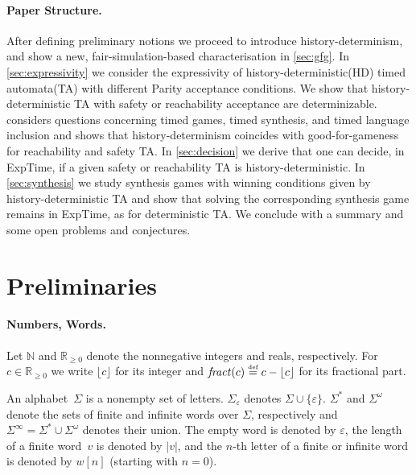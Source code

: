 \documentclass[10pt,a4paper]{amsart}
\theoremstyle{definition}
\numberwithin{equation}{section}
\renewcommand{\epsilon}{\varepsilon}
\newcommand{\size}[1]{|#1|}
\newcommand{\N}{\mathbb{N}}
\newcommand{\nnreals}{{\mathbb R}_{\geq 0}}
\newcommand{\eqby}[2][=]{\stackrel{\text{{\tiny{#2}}}}{#1}}
\newcommand{\eqdef}{\eqby{def}}
\newcommand{\fractof}[1]{{\it fract}(#1)} %
\newcommand{\intof}[1]{\floor{#1}}
\newcommand{\floor}[1]{\lfloor#1\rfloor}
\newcommand{\EXPTIME}{{\sc ExpTime}}
\newcommand{\mypar}[1]{\paragraph*{#1.}}
\begin{document}
\medskip
\mypar{Paper Structure}
After defining preliminary notions we proceed to introduce history-determinism,
and show a new, fair-simulation-based characterisation in \cref{sec:gfg}.
In \cref{sec:expressivity} we consider the expressivity of history-deterministic(HD) timed automata(TA) with different Parity acceptance conditions.
We show that history-deterministic TA with safety or reachability acceptance are determinizable.
considers questions concerning timed games, timed synthesis, and timed language inclusion
and shows that history-determinism coincides with good-for-gameness for reachability and safety TA.
In \cref{sec:decision} we derive that one can decide, in \EXPTIME, if a given safety or reachability TA is history-deterministic.
In \cref{sec:synthesis} we study synthesis games with winning conditions given by history-deterministic TA 
and show that solving the corresponding synthesis game remains in \EXPTIME, as for deterministic TA.
We conclude with a summary and some open problems and conjectures.
	
	\section{Preliminaries}
	\label{sec:definitions}
\mypar{Numbers, Words}
Let $\N$ and $\nnreals$ denote the nonnegative integers and reals, respectively. 
For $c\in\nnreals$ we write
$\intof{c}$ %
for its integer
and $\fractof{c} \eqdef c-\lfloor{c}\rfloor$
for its fractional part.

An alphabet~$\Sigma$ is a nonempty set of letters. $\Sigma_{\varepsilon}$ denotes $\Sigma\cup \{\varepsilon\}$.  $\Sigma^*$ and $\Sigma^\omega$ denote the sets of finite and infinite words over $\Sigma$, respectively and $\Sigma^\infty=\Sigma^*\cup \Sigma^\omega$ denotes their union.
The  empty word is denoted by $\epsilon$, the length of a finite word~$v$ is denoted by $\size{v}$, and the $n$-th letter of a finite or infinite word is denoted by $w[n]$ (starting with $n = 0$).
\end{document}
